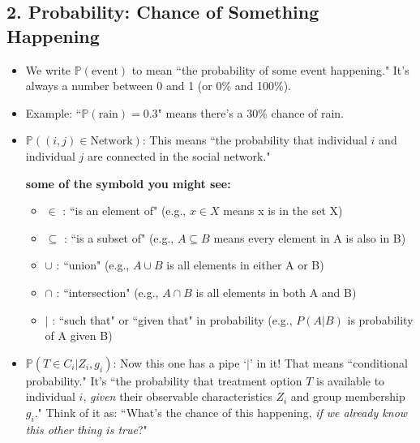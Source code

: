 \documentclass{article}
\renewcommand{\Pr}{\mathbb{P}}
\begin{document}
\subsection*{2. Probability: Chance of Something Happening}
\label{sec:probability_intro}
\begin{itemize}

    \item We write $\Pr(\text{event})$ to mean ``the probability of some event happening." It's always a number between 0 and 1 (or 0\% and 100\%).
    
    \item Example: ``$\Pr(\text{rain}) = 0.3$" means there's a 30\% chance of rain.
    
    \item $\Pr((i,j) \in \text{Network})$: This means ``the probability that individual $i$ and individual $j$ are connected in the social network."
    
    \begin{tcolorbox}[mycommentbox,title=mathematical symbols]
    \textbf{some of the symbold you might see:}
    \begin{itemize}
        \item $\in$ : ``is an element of" (e.g., $x \in X$ means x is in the set X)
        \item $\subseteq$ : ``is a subset of" (e.g., $A \subseteq B$ means every element in A is also in B)
        \item $\cup$ : ``union" (e.g., $A \cup B$ is all elements in either A or B)
        \item $\cap$ : ``intersection" (e.g., $A \cap B$ is all elements in both A and B)
        \item $|$ : ``such that" or ``given that" in probability (e.g., $P(A|B)$ is probability of A given B)
    \end{itemize}
    \end{tcolorbox}
    
    \item $\Pr(T \in C_i | Z_i, g_i)$: Now this one has a pipe `$|$' in it! That means ``conditional probability." It's ``the probability that treatment option $T$ is available to individual $i$, \textit{given} their observable characteristics $Z_i$ and group membership $g_i$." Think of it as: ``What's the chance of this happening, \textit{  if we already know this other thing is true}?"
    
\end{itemize}
\end{document}
